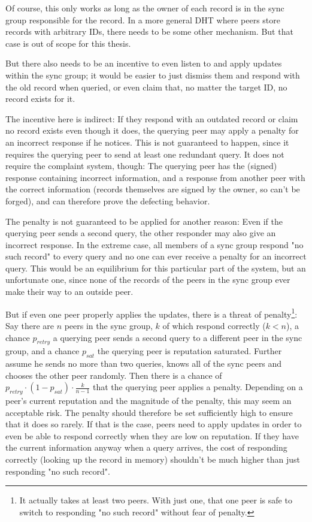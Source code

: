 Of course, this only works as long as the owner of each record is in the sync
group responsible for the record. In a more general \ac{DHT} where peers store
records with arbitrary IDs, there needs to be some other mechanism. But that
case is out of scope for this thesis.

But there also needs to be an incentive to even listen to and apply updates
within the sync group; it would be easier to just dismiss them and respond with
the old record when queried, or even claim that, no matter the target ID, no
record exists for it.

The incentive here is indirect: If they respond with an outdated record or claim
no record exists even though it does, the querying peer may apply a penalty for
an incorrect response if he notices. This is not guaranteed to happen, since it
requires the querying peer to send at least one redundant query. It does not
require the complaint system, though: The querying peer has the (signed)
response containing incorrect information, and a response from another peer with
the correct information (records themselves are signed by the owner, so can't be
forged), and can therefore prove the defecting behavior.

The penalty is not guaranteed to be applied for another reason: Even if the
querying peer sends a second query, the other responder may also give an
incorrect response. In the extreme case, all members of a sync group respond "no
such record" to every query and no one can ever receive a penalty for an
incorrect query. This would be an equilibrium for this particular part of the
system, but an unfortunate one, since none of the records of the peers in the
sync group ever make their way to an outside peer.

But if even one peer properly applies the updates, there is a threat of
penalty\footnote{It actually takes at least two peers. With just one, that one
peer is safe to switch to responding "no such record" without fear of penalty.}:
Say there are $n$ peers in the sync group, $k$ of which respond correctly ($k <
n$), a chance $p_{retry}$ a querying peer sends a second query to a different
peer in the sync group, and a chance $p_{sat}$ the querying peer is reputation
saturated. Further assume he sends no more than two queries, knows all of the
sync peers and chooses the other peer randomly. Then there is a chance of
$p_{retry} \cdot (1 - p_{sat}) \cdot \frac{k}{n - 1}$ that the querying peer
applies a penalty. Depending on a peer's current reputation and the magnitude of
the penalty, this may seem an acceptable risk. The penalty should therefore be
set sufficiently high to ensure that it does so rarely. If that is the case,
peers need to apply updates in order to even be able to respond correctly when
they are low on reputation. If they have the current information anyway when a
query arrives, the cost of responding correctly (looking up the record in
memory) shouldn't be much higher than just responding "no such record".

